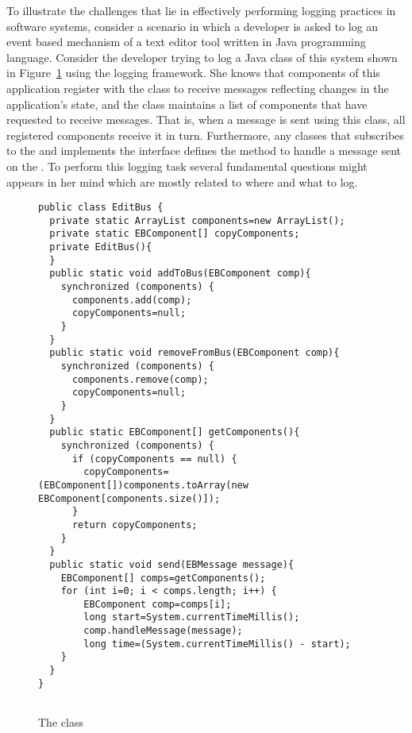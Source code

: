 To illustrate the challenges that lie in effectively performing logging practices in software systems, consider a scenario in which a developer is asked to log an event based mechanism of a text editor tool written in Java programming language. Consider the developer trying to log a Java class of this system shown in Figure~\ref{ch2-ex} using the  logging framework. She knows that components of this application register with the  class to receive messages reflecting changes in the application's state, and the  class maintains a list of components that have requested to receive messages. That is, when a message is sent using this class, all registered components receive it in turn. Furthermore, any classes that subscribes to the  and implements the  interface defines the method  to handle a message sent on the . To perform this logging task several fundamental questions might appears in her mind which are mostly related to where and what to log.

\begin{figure}[H]
\def\baselinestretch{1}
\begin{lstlisting}
public class EditBus {
  private static ArrayList components=new ArrayList();
  private static EBComponent[] copyComponents;
  private EditBus(){
  }
  public static void addToBus(EBComponent comp){
    synchronized (components) {
      components.add(comp);
      copyComponents=null;
    }
  }
  public static void removeFromBus(EBComponent comp){
    synchronized (components) {
      components.remove(comp);
      copyComponents=null;
    }
  }
  public static EBComponent[] getComponents(){
    synchronized (components) {
      if (copyComponents == null) {
        copyComponents=(EBComponent[])components.toArray(new EBComponent[components.size()]);
      }
      return copyComponents;
    }
  }
  public static void send(EBMessage message){
    EBComponent[] comps=getComponents();
    for (int i=0; i < comps.length; i++) {
        EBComponent comp=comps[i];
        long start=System.currentTimeMillis();
        comp.handleMessage(message);
        long time=(System.currentTimeMillis() - start);
    }
  }
}


\end{lstlisting}
\caption{The  class\label{ch2-ex}}
\end{figure}

